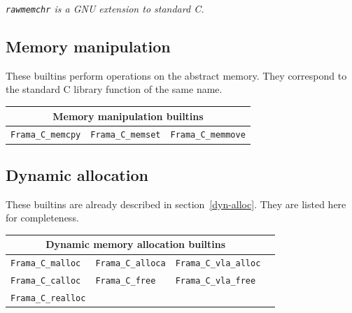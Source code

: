 \documentclass[web]{frama-c-book}
\makeatletter
\newenvironment{important}%
{\hspace{5pt plus \linewidth minus \marginparsep}%
 \begin{lrbox}{\@tempboxa}%
   \begin{minipage}{\linewidth - 2\fboxsep}\itshape}
{\end{minipage}\end{lrbox}\colorbox{gris}{\usebox{\@tempboxa}}}
\makeatother
\begin{document}
\begin{important}
  \lstinline|rawmemchr| is a GNU extension to standard C.
\end{important}

\subsection{Memory manipulation}
These builtins perform operations on the abstract memory.
They correspond to the standard C library function of the same name.

\begin{table}[!ht]
  \centering
  \begin{tabular}{ccc}
    \multicolumn{3}{c}{Memory manipulation builtins} \\
    \hline
    \lstinline|Frama_C_memcpy| &
    \lstinline|Frama_C_memset| &
    \lstinline|Frama_C_memmove|
  \end{tabular}
\end{table}

\subsection{Dynamic allocation}

These builtins are already described in section~\ref{dyn-alloc}.
They are listed here for completeness.

\begin{table}[!ht]
  \centering
  \begin{tabular}{llll}
    \multicolumn{3}{c}{Dynamic memory allocation builtins} \\
    \hline
    \lstinline|Frama_C_malloc| &
    \lstinline|Frama_C_alloca| &
    \lstinline|Frama_C_vla_alloc| \\
    \lstinline|Frama_C_calloc| &
    \lstinline|Frama_C_free| &
    \lstinline|Frama_C_vla_free| \\
    \lstinline|Frama_C_realloc|
  \end{tabular}
\end{table}
\end{document}
